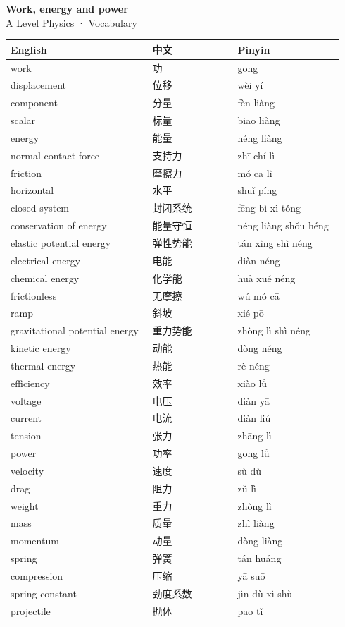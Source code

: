 \documentclass[11pt]{article}
\begin{document}
\begin{center}
  {\LARGE\bfseries Work, energy and power}\\[0.35em]
  {\large A Level Physics · Vocabulary}
\end{center}
\vspace{0.6em}

\begin{longtable}{@{}p{0.40\linewidth}p{0.24\linewidth}p{0.30\linewidth}@{}}
\toprule
\textbf{English} & \textbf{中文} & \textbf{Pinyin} \\
\midrule
\endhead
\bottomrule
\endlastfoot
work & 功 & gōng \\
displacement & 位移 & wèi yí \\
component & 分量 & fèn liàng \\
scalar & 标量 & biāo liàng \\
energy & 能量 & néng liàng \\
normal contact force & 支持力 & zhī chí lì \\
friction & 摩擦力 & mó cā lì \\
horizontal & 水平 & shuǐ píng \\
closed system & 封闭系统 & fēng bì xì tǒng \\
conservation of energy & 能量守恒 & néng liàng shǒu héng \\
elastic potential energy & 弹性势能 & tán xìng shì néng \\
electrical energy & 电能 & diàn néng \\
chemical energy & 化学能 & huà xué néng \\
frictionless & 无摩擦 & wú mó cā \\
ramp & 斜坡 & xié pō \\
gravitational potential energy & 重力势能 & zhòng lì shì néng \\
kinetic energy & 动能 & dòng néng \\
thermal energy & 热能 & rè néng \\
efficiency & 效率 & xiào lǜ \\
voltage & 电压 & diàn yā \\
current & 电流 & diàn liú \\
tension & 张力 & zhāng lì \\
power & 功率 & gōng lǜ \\
velocity & 速度 & sù dù \\
drag & 阻力 & zǔ lì \\
weight & 重力 & zhòng lì \\
mass & 质量 & zhì liàng \\
momentum & 动量 & dòng liàng \\
spring & 弹簧 & tán huáng \\
compression & 压缩 & yā suō \\
spring constant & 劲度系数 & jìn dù xì shù \\
projectile & 抛体 & pāo tǐ \\
\end{longtable}
\end{document}
